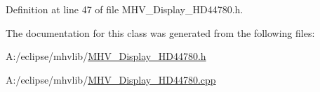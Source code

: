 \-Definition at line 47 of file \-M\-H\-V\-\_\-\-Display\-\_\-\-H\-D44780.\-h.



\-The documentation for this class was generated from the following files\-:\begin{DoxyCompactItemize}
\item 
\-A\-:/eclipse/mhvlib/\hyperlink{_m_h_v___display___h_d44780_8h}{\-M\-H\-V\-\_\-\-Display\-\_\-\-H\-D44780.\-h}\item 
\-A\-:/eclipse/mhvlib/\hyperlink{_m_h_v___display___h_d44780_8cpp}{\-M\-H\-V\-\_\-\-Display\-\_\-\-H\-D44780.\-cpp}\end{DoxyCompactItemize}
